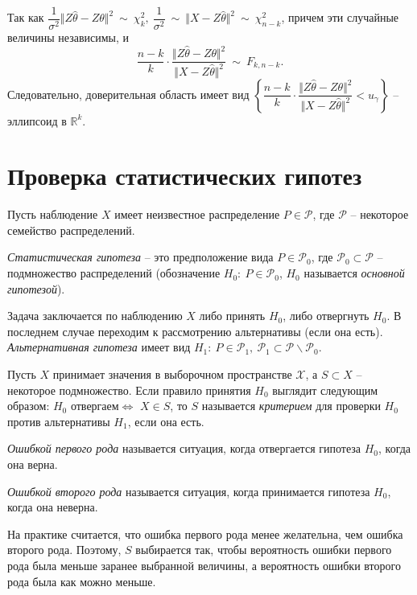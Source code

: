 Так как $\displaystyle \dfrac{1}{\sigma ^{2}}\Vert Z\hat{\theta } -Z\theta \Vert ^{2} \ \sim \ \chi _{k}^{2} ,\ \dfrac{1}{\sigma ^{2}} \ \sim \ \Vert X-Z\hat{\theta }\Vert ^{2} \ \sim \ \chi _{n-k}^{2}$, причем эти случайные величины независимы, и
\begin{equation*}
    \dfrac{n-k}{k} \cdotp \dfrac{\Vert Z\hat{\theta } -Z\theta \Vert ^{2}}{\Vert X-Z\hat{\theta }\Vert ^{2}} \ \sim \ F_{k,n-k} .
\end{equation*}
Следовательно, доверительная область имеет вид $\displaystyle \left\{\dfrac{n-k}{k} \cdotp \dfrac{\Vert Z\hat{\theta } -Z\theta \Vert ^{2}}{\Vert X-Z\hat{\theta }\Vert ^{2}} < u_{\gamma }\right\}$ -- эллипсоид в $\displaystyle \mathbb{R}^{k}$.
\section{Проверка статистических гипотез}

Пусть наблюдение $\displaystyle X$ имеет неизвестное распределение $\displaystyle P\in \mathcal{P}$, где $\displaystyle \mathcal{P}$ -- некоторое семейство распределений.
\begin{definition}
    \textit{Статистическая гипотеза} -- это предположение вида $\displaystyle P\in \mathcal{P}_{0}$, где $\displaystyle \mathcal{P}_{0} \subset \mathcal{P}$ -- подмножество распределений (обозначение $\displaystyle H_{0} :\ P\in \mathcal{P}_{0}$, $\displaystyle H_{0}$ называется \textit{основной гипотезой}).
\end{definition}
Задача заключается по наблюдению $\displaystyle X$ либо принять $\displaystyle H_{0}$, либо отвергнуть $\displaystyle H_{0}$. В последнем случае переходим к рассмотрению альтернативы (если она есть). \textit{Альтернативная гипотеза} имеет вид $\displaystyle H_{1} :\ P\in \mathcal{P}_{1} ,\ \mathcal{P}_{1} \subset \mathcal{P} \backslash \mathcal{P}_{0}$.
\begin{definition}
    Пусть $\displaystyle X$ принимает значения в выборочном пространстве $\displaystyle \mathcal{X}$, а $\displaystyle S\subset X$ -- некоторое подмножество. Если правило принятия $\displaystyle H_{0}$ выглядит следующим образом: $\displaystyle H_{0}$ отвергаем$\displaystyle \Leftrightarrow $ $\displaystyle X\in S$, то $\displaystyle S$ называется \textit{критерием} для проверки $\displaystyle H_{0}$ против альтернативы $\displaystyle H_{1}$, если она есть.
\end{definition}
\begin{definition}
    \textit{Ошибкой первого рода} называется ситуация, когда отвергается гипотеза $\displaystyle H_{0}$, когда она верна.
\end{definition}
\begin{definition}
    \textit{Ошибкой второго рода} называется ситуация, когда принимается гипотеза $\displaystyle H_{0}$, когда она неверна.
\end{definition}
\begin{note}
    На практике считается, что ошибка первого рода менее желательна, чем ошибка второго рода. Поэтому, $\displaystyle S$ выбирается так, чтобы вероятность ошибки первого рода была меньше заранее выбранной величины, а вероятность ошибки второго рода была как можно меньше.
\end{note}
